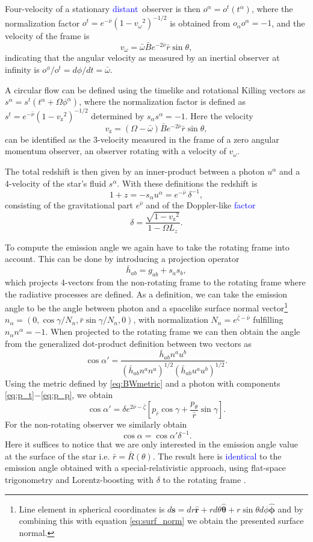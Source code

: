 \documentclass{aa}
\newcommand{\be}{\begin{equation}}
\newcommand{\ee}{\end{equation}}
\renewcommand{\vec}[1]{\ensuremath{\boldsymbol{#1}}}
\newcommand{\refe}[1]{\textcolor{blue}{{#1}}}
\newcommand{\rb}{\ensuremath{\bar{r}}}
\newcommand{\wb}{\ensuremath{\bar{\omega}}}
\newcommand{\nub}{\ensuremath{\bar{\nu}}}
\newcommand{\zetab}{\ensuremath{\bar{\zeta}}}
\newcommand{\Bb}{\ensuremath{\bar{B}}}
\newcommand{\vw}{\ensuremath{v_{\omega}}}
\newcommand{\vz}{\ensuremath{v_{\mathrm{z}}}}
\begin{document}
Four-velocity of a stationary \refe{distant} observer is then $o^{\alpha} = o^t(t^{\alpha})$, where the normalization factor $o^t = e^{-\nub}(1-\vw^2)^{-1/2}$ is obtained from $o_{\alpha}o^{\alpha} = -1$, and the velocity of the frame is 
\be
\vw = \wb \Bb e^{-2\nub} \rb \sin\theta,
\ee
indicating that the angular velocity as measured by an inertial observer at infinity is $o^{\phi} / o^{t} = d\phi/dt = \wb$.

A circular flow can be defined using the timelike and rotational Killing vectors as $s^{\alpha} = s^t (t^{\alpha} + \Omega \phi^{\alpha})$, where the normalization factor is defined as $s^t = e^{-\nub} (1 - \vz^2)^{-1/2}$ determined by $s_{\alpha}s^{\alpha} = -1$.
Here the velocity 
\be
\vz = (\Omega - \wb) \Bb e^{-2\nub} \rb \sin\theta,
\ee
can be identified as the 3-velocity measured in the frame of a zero angular momentum observer, an observer rotating with a velocity of $\vw$.

The total redshift is then given by an inner-product between a photon $u^{\alpha}$ and a 4-velocity of the star's fluid $s^{\alpha}$.
With these definitions the redshift is
\be\label{eq:redshift}
1 + z = -s_{\alpha} u^{\alpha} = e^{-\nub} ~\delta^{-1},
\ee
consisting of the gravitational part $e^{\nub}$ and of the Doppler-like \refe{factor}
\be
\delta = \frac{\sqrt{1-\vz^2}}{1 - \Omega L_z}.
\ee

To compute the emission angle we again have to take the rotating frame into account.  
This can be done by introducing a projection operator 
\be
\bar{h}_{ab} = g_{ab} + s_a s_b, 
\ee
which projects 4-vectors from the non-rotating frame to the rotating frame where the radiative processes are defined.  
As a definition, we can take the emission angle to be the angle between photon and a spacelike surface normal vector\footnote{
Line element in spherical coordinates is $d\vec{s} = dr \vec{\hat{r}} + r d\theta \vec{\hat{\theta}} + r \sin\theta d\phi \vec{\hat{\phi}}$ and by combining this with equation \eqref{eq:surf_norm} we obtain the presented surface normal.
}
$n_{\alpha} = (0, \cos\gamma/N_n, \rb \sin\gamma/N_n, 0)$, with normalization $N_n = e^{\zetab - \nub}$ fulfilling $n_{\alpha}n^{\alpha} = -1$.  
When projected to the rotating frame we can then obtain the angle from the generalized dot-product definition between two vectors as
\be\label{eq:gen_angle}
\cos\alpha' = \frac{\bar{h}_{ab}n^a u^b}{(\bar{h}_{ab} n^a n^a)^{1/2} (\bar{h}_{ab} u^a u^b)^{1/2}}.
\ee
Using the metric defined by \eqref{eq:BWmetric} and a photon with components \eqref{eq:p_t}$-$\eqref{eq:p_p}, we obtain
\be\label{eq:cosap}
\cos\alpha' = \delta e^{2\nub-\zetab} \left[ p_{\rb} \cos\gamma + \frac{p_{\theta}}{\rb}\sin\gamma \right].
\ee
For the non-rotating observer we similarly obtain 
\be\label{eq:cosa}
\cos\alpha = \cos\alpha' \delta^{-1}.
\ee
Here it suffices to notice that we are only interested in the emission angle value at the surface of the star i.e. $\rb = \bar{R}(\theta)$.
The result here is \refe{identical} to the emission angle obtained with a special-relativistic approach, using flat-space trigonometry and Lorentz-boosting with $\delta$ to the rotating frame \citep[see e.g.,][]{PB06}.
\end{document}
